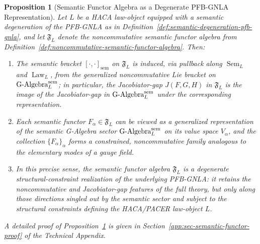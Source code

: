 \documentclass[11pt]{book}
\theoremstyle{plain}
\newtheorem{proposition}[theorem]{Proposition}
\theoremstyle{definition}
\theoremstyle{remark}
\begin{document}
\begin{proposition}[Semantic Functor Algebra as a Degenerate PFB-GNLA Representation]
\label{prop:semantic-functor-as-degenerate-rep}
Let $L$ be a HACA law-object equipped with a semantic degeneration of the
PFB-GNLA as in
Definition~\ref{def:semantic-degeneration-pfb-gnla}, and let
$\mathfrak{F}_L$ denote the noncommutative semantic functor algebra
from Definition~\ref{def:noncommutative-semantic-functor-algebra}.
Then:
\begin{enumerate}
  \item The semantic bracket
        $[\cdot,\cdot]_{\mathrm{sem}}$ on $\mathfrak{F}_L$ is induced,
        via pullback along $\operatorname{Sem}_L$ and $\operatorname{Law}_L$,
        from the generalized noncommutative Lie bracket on
        $\text{G-Algebra}^{\mathrm{sem}}_L$; in particular, the Jacobiator-gap
        $J(F,G,H)$ in $\mathfrak{F}_L$ is the image of the Jacobiator-gap
        in $\text{G-Algebra}^{\mathrm{sem}}_L$ under the corresponding
        representation.
  \item Each semantic functor $F_\alpha\in\mathfrak{F}_L$ can be viewed
        as a generalized representation of the semantic G-Algebra sector
        $\text{G-Algebra}^{\mathrm{sem}}_L$ on its value space $V_\alpha$, and
        the collection $\{F_\alpha\}_\alpha$ forms a constrained,
        noncommutative family analogous to the elementary modes of a
        gauge field.
  \item In this precise sense, the semantic functor algebra
        $\mathfrak{F}_L$ is a degenerate structural-constraint
        realization of the underlying PFB-GNLA: it retains the
        noncommutative and Jacobiator-gap features of the full theory,
        but only along those directions singled out by the semantic
        sector and subject to the structural constraints defining the
        HACA/PACER law-object $L$.
\end{enumerate}

A detailed proof of
Proposition~\ref{prop:semantic-functor-as-degenerate-rep}
is given in Section~\ref{app:sec-semantic-functor-proof} of the
Technical Appendix.

\end{proposition}
\end{document}
